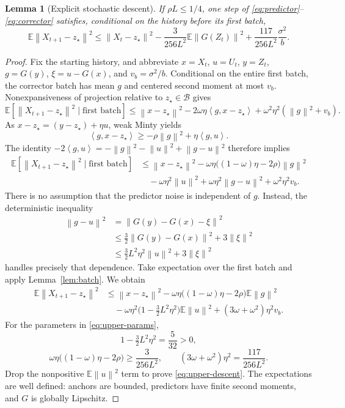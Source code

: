 \documentclass[11pt,a4paper]{article}
\newcommand{\E}{\mathbb E}
\newcommand{\norm}[1]{\left\lVert #1\right\rVert}
\newcommand{\inner}[2]{\left\langle #1,#2\right\rangle}
\newtheorem{lemma}[theorem]{Lemma}
\theoremstyle{definition}
\theoremstyle{remark}
\begin{document}
\begin{lemma}[Explicit stochastic descent]\label{lem:upper-descent}
If $\rho L\le1/4$, one step of \eqref{eq:predictor}--\eqref{eq:corrector} satisfies, conditional on the history before its first batch,
\begin{equation}\label{eq:upper-descent}
 \E\norm{X_{t+1}-z_\star}^2
 \le \norm{X_t-z_\star}^2
 -\frac{3}{256L^2}\E\norm{G(Z_t)}^2
 +\frac{117}{256L^2}\frac{\sigma^2}{b}.
\end{equation}
\end{lemma}
\begin{proof}
Fix the starting history, and abbreviate $x=X_t$, $u=U_t$, $y=Z_t$, $g=G(y)$, $\xi=u-G(x)$, and $v_b=\sigma^2/b$. Conditional on the entire first batch, the corrector batch has mean $g$ and centered second moment at most $v_b$. Nonexpansiveness of projection relative to $z_\star\in\mathcal B$ gives
\[
 \E[\norm{X_{t+1}-z_\star}^2\mid\text{first batch}]
 \le \norm{x-z_\star}^2
      -2\omega\eta\inner{g}{x-z_\star}
      +\omega^2\eta^2(\norm g^2+v_b).
\]
As $x-z_\star=(y-z_\star)+\eta u$, weak Minty yields
\[
 \inner g{x-z_\star}\ge-\rho\norm g^2+\eta\inner g u.
\]
The identity $-2\inner gu=-\norm g^2-\norm u^2+\norm{g-u}^2$ therefore implies
\begin{align}\label{eq:upper-before}
 \E[\norm{X_{t+1}-z_\star}^2\mid\text{first batch}]
 &\le \norm{x-z_\star}^2
 -\omega\eta\big((1-\omega)\eta-2\rho\big)\norm g^2\nonumber\\
 &\quad-\omega\eta^2\norm u^2
       +\omega\eta^2\norm{g-u}^2+\omega^2\eta^2v_b.
\end{align}
There is no assumption that the predictor noise is independent of $g$. Instead, the deterministic inequality
\begin{align*}
 \norm{g-u}^2
 &=\norm{G(y)-G(x)-\xi}^2\\
 &\le\tfrac32\norm{G(y)-G(x)}^2+3\norm{\xi}^2\\
 &\le\tfrac32L^2\eta^2\norm u^2+3\norm{\xi}^2
\end{align*}
handles precisely that dependence. Take expectation over the first batch and apply Lemma~\ref{lem:batch}. We obtain
\begin{align*}
 \E\norm{X_{t+1}-z_\star}^2
 &\le\norm{x-z_\star}^2
 -\omega\eta\big((1-\omega)\eta-2\rho\big)\E\norm g^2\\
 &\quad-\omega\eta^2\big(1-\tfrac32L^2\eta^2\big)\E\norm u^2
 +(3\omega+\omega^2)\eta^2v_b.
\end{align*}
For the parameters in \eqref{eq:upper-params},
\[
 1-\tfrac32L^2\eta^2=\frac5{32}>0,
\]
\[
 \omega\eta\big((1-\omega)\eta-2\rho\big)
 \ge\frac3{256L^2},\qquad
 (3\omega+\omega^2)\eta^2=\frac{117}{256L^2}.
\]
Drop the nonpositive $\E\norm u^2$ term to prove \eqref{eq:upper-descent}. The expectations are well defined: anchors are bounded, predictors have finite second moments, and $G$ is globally Lipschitz.
\end{proof}
\end{document}
